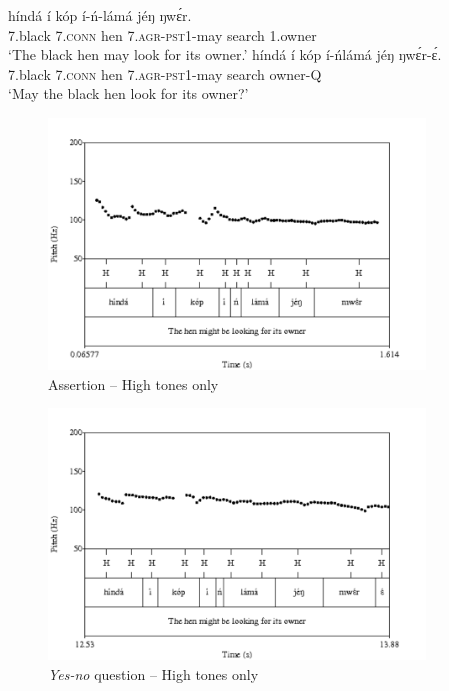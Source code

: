 \documentclass[output=paper,newtxmath,modfonts,nonflat]{langsci/langscibook}
\begin{document}
\ea \label{ex:HamlaouiMakasso:2} 
\ea \gll hínd{á} í kóp í-ń-l{á}m{á} j\'eŋ ŋw\'ɛr.\\
7.black 7.\textsc{conn} hen 7.\textsc{agr}-\textsc{pst}1-may search 1.owner\\
\glt `The black hen may look for its owner.'\label{ex:HamlaouiMakasso:2a} 
\ex \gll hínd{á} í kóp í-ńl{á}m{á} j\'eŋ ŋw\'ɛr-\'ɛ.\\
7.black 7.\textsc{conn} hen 7.\textsc{agr}-\textsc{pst}1-may search owner-Q\\
\glt `May the black hen look for its owner?'\label{ex:HamlaouiMakasso:2b} 
\z
\z


\begin{figure}
\centering
 \includegraphics[width=10cm]{figures/HenManNov}  
\caption{Assertion -- High tones only \citep{MakassoEtAl17} \label{fig:HamlaouiMakasso:3}}
\end{figure}

\begin{figure}
\centering
\includegraphics[width=10cm]{figures/HenManQNov}  
\caption{\emph{Yes-no} question -- High tones only \citep{MakassoEtAl17} \label{fig:HamlaouiMakasso:4}}
\end{figure}
\end{document}
